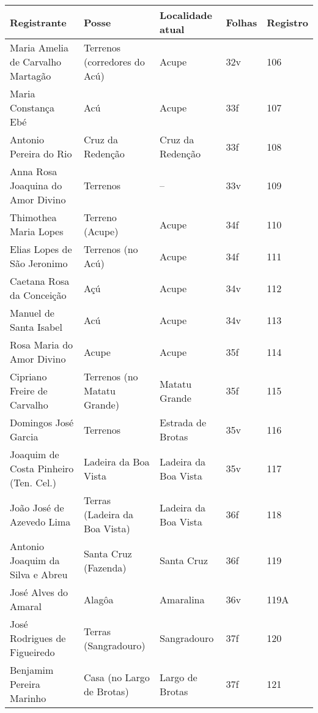 \begin{table}[ht]
{
\begin{minipage}{\textwidth}
\begin{tiny}
\begin{tabular}{p{4cm}p{4cm}p{4cm}ll}
\toprule
Registrante									&Posse					&Localidade atual			&Folhas			&Registro		\\
\midrule
\midrule
Maria Amelia de Carvalho Martagão						&Terrenos (corredores do Acú)		&Acupe					&32v			&106			\\
Maria Constança Ebé								&Acú					&Acupe					&33f			&107			\\
Antonio Pereira do Rio								&Cruz da Redenção			&Cruz da Redenção			&33f			&108			\\
Anna Rosa Joaquina do Amor Divino							&Terrenos				&--					&33v			&109			\\
Thimothea Maria Lopes								&Terreno (Acupe)			&Acupe					&34f			&110			\\
Elias Lopes de São Jeronimo							&Terrenos (no Acú)			&Acupe					&34f			&111			\\
Caetana Rosa da Conceição							&Açú					&Acupe					&34v			&112			\\
Manuel de Santa Isabel								&Acú					&Acupe					&34v			&113			\\
Rosa Maria do Amor Divino							&Acupe					&Acupe					&35f			&114			\\
Cipriano Freire de Carvalho							&Terrenos (no Matatu Grande)		&Matatu Grande				&35f			&115			\\
Domingos José Garcia								&Terrenos				&Estrada de Brotas			&35v			&116			\\
Joaquim de Costa Pinheiro (Ten. Cel.)						&Ladeira da Boa Vista			&Ladeira da Boa Vista			&35v			&117			\\
João José de Azevedo Lima							&Terras (Ladeira da Boa Vista)		&Ladeira da Boa Vista			&36f			&118			\\
Antonio Joaquim da Silva e Abreu						&Santa Cruz (Fazenda)			&Santa Cruz				&36f			&119			\\
José Alves do Amaral								&Alagôa					&Amaralina				&36v			&119A			\\
José Rodrigues de Figueiredo							&Terras (Sangradouro)			&Sangradouro				&37f			&120			\\
Benjamim Pereira Marinho							&Casa (no Largo de Brotas)		&Largo de Brotas			&37f			&121			\\

\end{tabular}
\end{tiny}
\end{minipage}}
\end{table}
